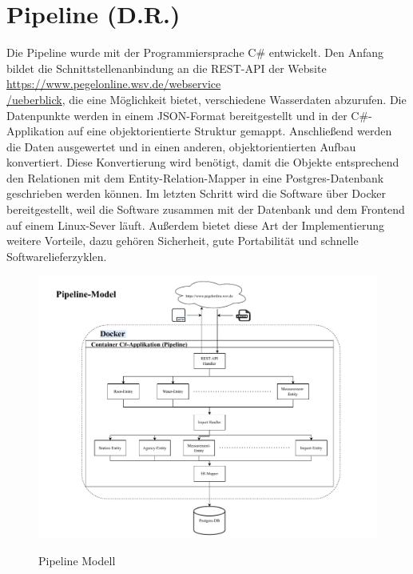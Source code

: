 \section{Pipeline (D.R.)}
\label{sec-pipeline}
Die Pipeline wurde mit der Programmiersprache C\# \cite{billwagner} entwickelt. Den Anfang bildet die Schnittstellenanbindung an die REST-API der Website 
\href{https://www.pegelonline.wsv.de/webservice/ueberblick}{https://www.pegelonline.wsv.de/webservice\\/ueberblick}, 
die eine Möglichkeit bietet, verschiedene Wasserdaten abzurufen. Die Datenpunkte werden in einem JSON-Format bereitgestellt und in der C\#-Applikation
auf eine objektorientierte Struktur gemappt. Anschließend werden die Daten ausgewertet und in einen anderen, objektorientierten Aufbau konvertiert. Diese Konvertierung wird benötigt, 
damit die Objekte entsprechend den Relationen mit dem Entity-Relation-Mapper in eine Postgres-Datenbank geschrieben werden können.
Im letzten Schritt wird die Software über Docker bereitgestellt, weil die Software zusammen mit der Datenbank und dem Frontend 
auf einem Linux-Sever läuft. Außerdem bietet diese Art der Implementierung 
weitere Vorteile, dazu gehören Sicherheit, gute Portabilität und schnelle Softwarelieferzyklen.  
\begin{figure}[H]
    \centering
    \includegraphics[width=\linewidth]{figures/Pipeline.pdf}
    \label{fig:pipeline}
    \caption{Pipeline Modell}
\end{figure}
\newpage
